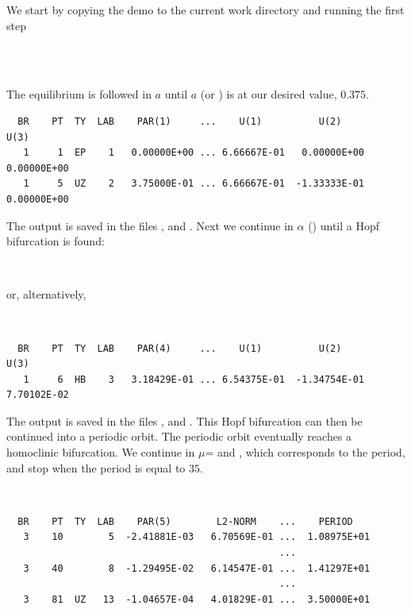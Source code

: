 \documentclass[12pt]{report}
\begin{document}
We start by copying the demo to the current work directory 
and running the first step
\begin{center}
\\
 \\
\end{center}
The equilibrium is followed in $a$ until $a$ (or ) is at our
desired value, $0.375$.
\begin{verbatim}
  BR    PT  TY  LAB    PAR(1)     ...    U(1)          U(2)          U(3)     
   1     1  EP    1   0.00000E+00 ... 6.66667E-01   0.00000E+00   0.00000E+00
   1     5  UZ    2   3.75000E-01 ... 6.66667E-01  -1.33333E-01   0.00000E+00
\end{verbatim}
The output is saved in the files ,  and
.
Next we continue in $\alpha$ () until a Hopf bifurcation is
found:
\begin{center}
\\
\end{center}
or, alternatively,
\begin{center}
\\
\end{center}
\begin{verbatim}
  BR    PT  TY  LAB    PAR(4)     ...    U(1)          U(2)          U(3)     
   1     6  HB    3   3.18429E-01 ... 6.54375E-01  -1.34754E-01   7.70102E-02
\end{verbatim}
The output is saved in the files ,  and
.
This Hopf bifurcation can then be continued into a periodic orbit. The
periodic orbit eventually reaches a homoclinic bifurcation. We
continue in $\mu$= and , 
which corresponds to the period, and stop when the period is equal to $35$.
\begin{center}
 \\
\end{center}
\begin{verbatim}
  BR    PT  TY  LAB    PAR(5)        L2-NORM    ...    PERIOD    
   3    10        5  -2.41881E-03   6.70569E-01 ...  1.08975E+01
                                                ...
   3    40        8  -1.29495E-02   6.14547E-01 ...  1.41297E+01
                                                ...
   3    81  UZ   13  -1.04657E-04   4.01829E-01 ...  3.50000E+01
\end{verbatim}
\end{document}
